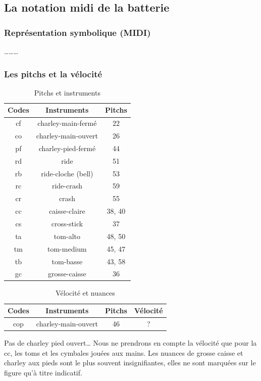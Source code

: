 \subsection{La notation midi de la batterie}
\subsubsection{Représentation symbolique (MIDI)}
………\\
\subsubsection{Les pitchs et la vélocité}
\begin{table}[h]
	\centering
	\begin{tabular}{|c|c|c|} \hline
		Codes & Instruments & Pitchs \\ \hline
		cf & charley-main-fermé & 22 \\
		co & charley-main-ouvert & 26 \\
		pf & charley-pied-fermé & 44 \\
		rd & ride & 51 \\
		rb & ride-cloche (bell) & 53 \\
		rc & ride-crash & 59 \\
		cr & crash & 55 \\
		cc & caisse-claire & 38, 40 \\
		cs & cross-stick & 37 \\
		ta & tom-alto & 48, 50 \\
		tm & tom-medium & 45, 47 \\
		tb & tom-basse & 43, 58 \\
		gc & grosse-caisse & 36 \\ \hline
	\end{tabular}
	\caption{Pitchs et instruments}
\end{table}
\begin{table}[h]
	\centering
	\begin{tabular}{|c|c|c|c|} \hline
		Codes & Instruments & Pitchs & Vélocité \\ \hline
		cop & charley-main-ouvert & 46 & ? \\ \hline
	\end{tabular}
	\caption{Vélocité et nuances}
\end{table}
Pas de charley pied ouvert…
Nous ne prendrons en compte la vélocité que pour la cc, les toms et les cymbales jouées aux mains. Les nuances de grosse caisse et charley aux pieds sont le plus souvent insignifiantes, elles ne sont marquées sur le figure qu’à titre indicatif.\\\\
